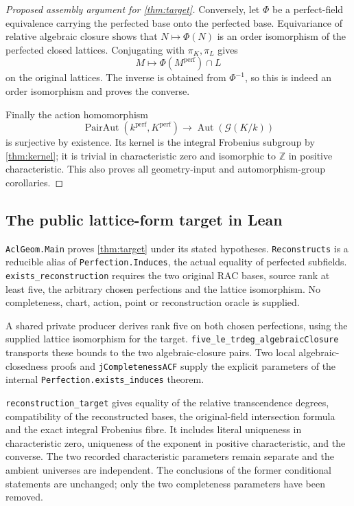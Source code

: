 \documentclass[11pt,oneside]{article}
\theoremstyle{definition}
\theoremstyle{remark}
\newcommand{\Aut}{\operatorname{Aut}}
\newcommand{\G}{\mathcal{G}}
\newcommand{\lean}[1]{\nolinkurl{#1}}
\begin{document}
\begin{proof}[Proposed assembly argument for \cref{thm:target}]
Conversely, let $\Phi$ be a perfect-field equivalence carrying the perfected base onto
the perfected base.  Equivariance of relative algebraic closure shows that
$N\mapsto\Phi(N)$ is an order isomorphism of the perfected closed lattices.  Conjugating
with $\pi_K,\pi_L$ gives
\[
 M\longmapsto \Phi(M^{\mathrm{perf}})\cap L
\]
on the original lattices.  The inverse is obtained from $\Phi^{-1}$, so this is indeed an
order isomorphism and proves the converse.

Finally the action homomorphism
\[
 \operatorname{PairAut}(k^{\mathrm{perf}},K^{\mathrm{perf}})
 \longrightarrow\Aut(\G(K/k))
\]
is surjective by existence.  Its kernel is the integral Frobenius subgroup by
\cref{thm:kernel}; it is trivial in characteristic zero and isomorphic to $\mathbb Z$ in
positive characteristic.  This also proves all geometry-input and automorphism-group
corollaries.
\end{proof}

\subsection{The public lattice-form target in Lean}

\lean{AclGeom.Main} proves \cref{thm:target} under its stated hypotheses.
\lean{Reconstructs} is a reducible alias of \lean{Perfection.Induces}, the actual equality
of perfected subfields.  \lean{exists_reconstruction} requires the two original RAC bases,
source rank at least five, the arbitrary chosen perfections and the lattice isomorphism.
No completeness, chart, action, point or reconstruction oracle is supplied.

A shared private producer derives rank five on both chosen perfections, using the supplied
lattice isomorphism for the target.  \lean{five_le_trdeg_algebraicClosure} transports these
bounds to the two algebraic-closure pairs.  Two local algebraic-closedness proofs and
\lean{jCompletenessACF} supply the explicit parameters of the internal
\lean{Perfection.exists_induces} theorem.

\lean{reconstruction_target} gives equality of the relative transcendence degrees,
compatibility of the reconstructed bases, the original-field intersection formula and
the exact integral Frobenius fibre.  It includes literal uniqueness in characteristic
zero, uniqueness of the exponent in positive characteristic, and the converse.  The two
recorded characteristic parameters remain separate and the ambient universes are
independent.  The conclusions of the former conditional statements are unchanged; only
the two completeness parameters have been removed.
\end{document}
